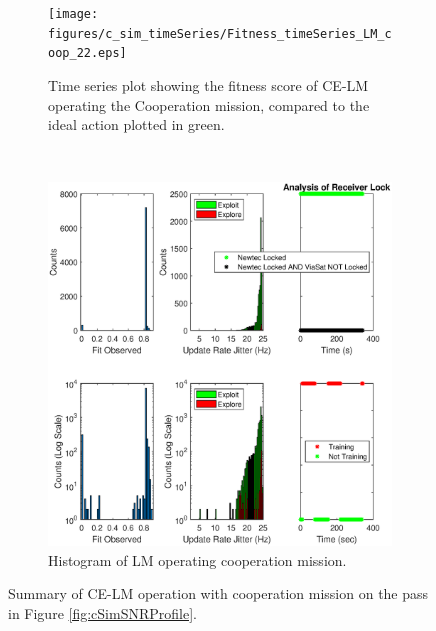\begin{figure}[ht!]
\centering
\begin{subfigure}{\linewidth}
	\centering
	\texttt{[image: figures/c\_sim\_timeSeries/Fitness\_timeSeries\_LM\_coop\_22.eps]}
	\caption{Time series plot showing the fitness score of CE-LM operating the Cooperation mission, compared to the ideal action plotted in green.}
	\label{fig:cSimLMOverview}
\end{subfigure}\\
\begin{subfigure}{\linewidth}
	\centering
	\includegraphics[scale=0.5]{figures/c_sim_results/sim22_LM_hists_coop.eps}
	\caption{Histogram of LM operating cooperation mission.}
	\label{fig:cSimLMHists}
\end{subfigure}
\caption{Summary of CE-LM operation with cooperation mission on the pass in Figure \ref{fig:cSimSNRProfile}.}
\label{fig:c22LMCoop}
\end{figure}

